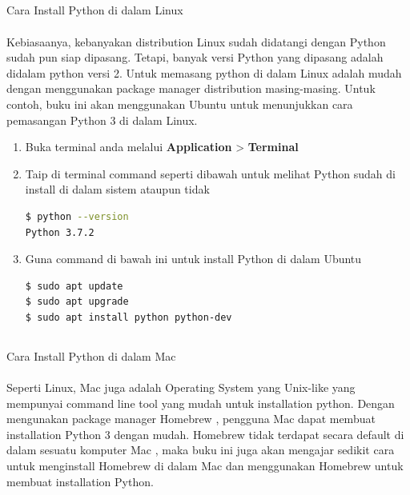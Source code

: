 \subsection{}
Cara Install Python di dalam Linux

\paragraph{}
Kebiasaanya, kebanyakan distribution Linux sudah didatangi dengan Python sudah pun siap dipasang. Tetapi, banyak versi Python yang dipasang adalah didalam python versi 2. Untuk memasang python di dalam Linux adalah mudah dengan menggunakan package manager distribution masing-masing. Untuk contoh, buku ini akan menggunakan Ubuntu untuk menunjukkan cara pemasangan Python 3 di dalam Linux.

\begin{enumerate}
	\item Buka terminal anda melalui \textbf{Application} > \textbf{Terminal} 
	\item Taip di terminal command seperti dibawah untuk melihat Python sudah di install di dalam sistem ataupun tidak
		\begin{lstlisting}[language=bash]
$ python --version
Python 3.7.2
		\end{lstlisting}
	\item Guna command di bawah ini untuk install Python di dalam Ubuntu
		\begin{lstlisting}[language=bash]
$ sudo apt update
$ sudo apt upgrade
$ sudo apt install python python-dev
		\end{lstlisting}
\end{enumerate}

\subsection{}
Cara Install Python di dalam Mac

\paragraph{}
Seperti Linux, Mac juga adalah Operating System yang Unix-like yang mempunyai command line tool yang mudah untuk installation python. Dengan mengunakan package manager Homebrew , pengguna Mac dapat membuat installation Python 3 dengan mudah.
Homebrew tidak terdapat secara default di dalam sesuatu komputer Mac , maka buku ini juga akan mengajar sedikit cara untuk menginstall Homebrew di dalam Mac dan menggunakan Homebrew untuk membuat installation Python.

